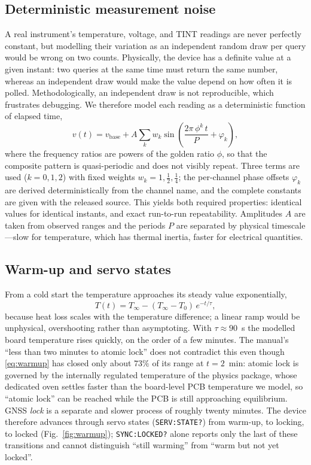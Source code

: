 \documentclass[conference]{IEEEtran}
\begin{document}
\subsection{Deterministic measurement noise}
A real instrument's temperature, voltage, and TINT readings are never
perfectly constant, but modelling their variation as an independent
random draw per query would be wrong on two counts. Physically, the
device has a definite value at a given instant: two queries at the same
time must return the same number, whereas an independent draw would make
the value depend on how often it is polled. Methodologically, an
independent draw is not reproducible, which frustrates debugging. We
therefore model each reading as a deterministic function of elapsed
time,
\begin{equation}
v(t) = v_{\mathrm{base}} + A \sum_{k} w_k
       \sin\!\left(\frac{2\pi\,\phi^{k}\,t}{P} + \varphi_k\right),
\label{eq:noise}
\end{equation}
where the frequency ratios are powers of the golden ratio $\phi$, so
that the composite pattern is quasi-periodic and does not visibly
repeat. Three terms are used ($k=0,1,2$) with fixed weights
$w_k=1,\tfrac12,\tfrac14$; the per-channel phase offsets $\varphi_k$
are derived deterministically from the channel name, and the complete
constants are given with the released source. This yields both required
properties: identical values for identical instants, and exact
run-to-run repeatability. Amplitudes $A$ are taken from observed ranges
and the periods $P$ are separated by physical timescale---slow for
temperature, which has thermal inertia, faster for electrical
quantities.

\subsection{Warm-up and servo states}
\label{sec:warmup}
From a cold start the temperature approaches its steady value
exponentially,
\begin{equation}
T(t) = T_\infty - (T_\infty - T_0)\,e^{-t/\tau},
\label{eq:warmup}
\end{equation}
because heat loss scales with the temperature difference; a linear ramp
would be unphysical, overshooting rather than asymptoting. With
$\tau\approx 90$~s the modelled board temperature rises quickly, on the
order of a few minutes. The manual's ``less than two minutes to atomic
lock'' does not contradict this even though \eqref{eq:warmup} has closed
only about $73\%$ of its range at $t=2$~min: atomic lock is governed by
the internally regulated temperature of the physics package, whose
dedicated oven settles faster than the board-level PCB temperature we
model, so ``atomic lock'' can be reached while the PCB is still
approaching equilibrium. GNSS \emph{lock} is a separate and slower
process of roughly twenty minutes. The device therefore advances through
servo states (\texttt{SERV:STATE?}) from warm-up, to locking, to locked
(Fig.~\ref{fig:warmup}); \texttt{SYNC:LOCKED?} alone reports only the
last of these transitions and cannot distinguish ``still warming'' from
``warm but not yet locked''.
\end{document}
